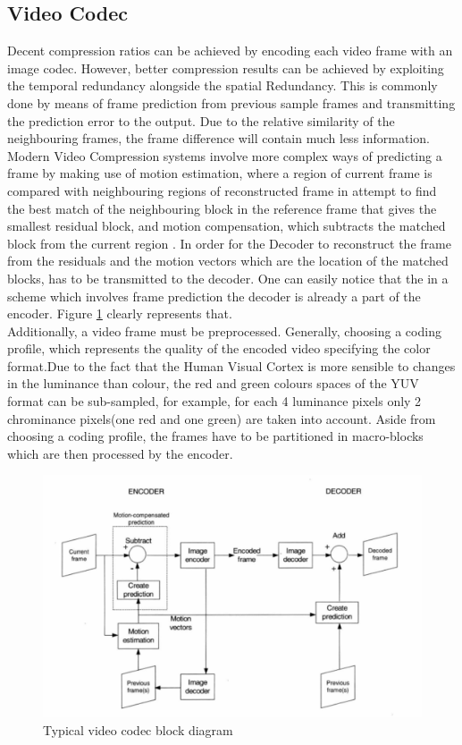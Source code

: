 \documentclass[a4paper,11pt,oneside]{article}
\begin{document}
\subsection{Video Codec}
\indent Decent compression ratios can be achieved by encoding each video frame with an image codec. However, better compression results can be achieved by exploiting the temporal redundancy alongside the spatial Redundancy. This is commonly done by means of frame prediction from previous sample frames and transmitting the prediction error to the output. Due to the relative similarity of the neighbouring frames, the frame difference will contain much less information. Modern Video Compression systems involve more complex ways of predicting a frame by making use of motion estimation, where a region of current frame is compared with neighbouring regions of reconstructed frame in attempt to find the best match of the neighbouring block in the reference frame that gives the smallest residual block, and motion compensation, which subtracts the matched block from the current region \cite[pp.~44]{richardson2002video}. In order for the Decoder to reconstruct the frame from the residuals and the motion vectors which are the location of the matched blocks, has to be transmitted to the decoder. One can easily notice that the in a scheme which involves frame prediction the decoder is already a part of the encoder. Figure \ref{figure:codec_block_diagram} clearly represents that. \\
Additionally, a video frame must be preprocessed. Generally, choosing a coding profile, which represents the quality of the encoded video specifying the color format.Due to the fact that the Human Visual Cortex is more sensible to changes in the luminance than colour, the red and green colours spaces of the YUV format can be sub-sampled, for example, for each 4 luminance pixels only 2 chrominance pixels(one red and one green) are taken into account. Aside from choosing  a coding profile, the frames have to be partitioned in macro-blocks which are then processed by the encoder. \\
\begin{figure}[h]
  \centering
  \includegraphics[width=\textwidth]{../figures/f1_codec_block_diagram.pdf}
  \caption{Typical video codec block diagram\cite[pp.~44]{richardson2002video}}
  \label{figure:codec_block_diagram}
\end{figure} 
\end{document}

